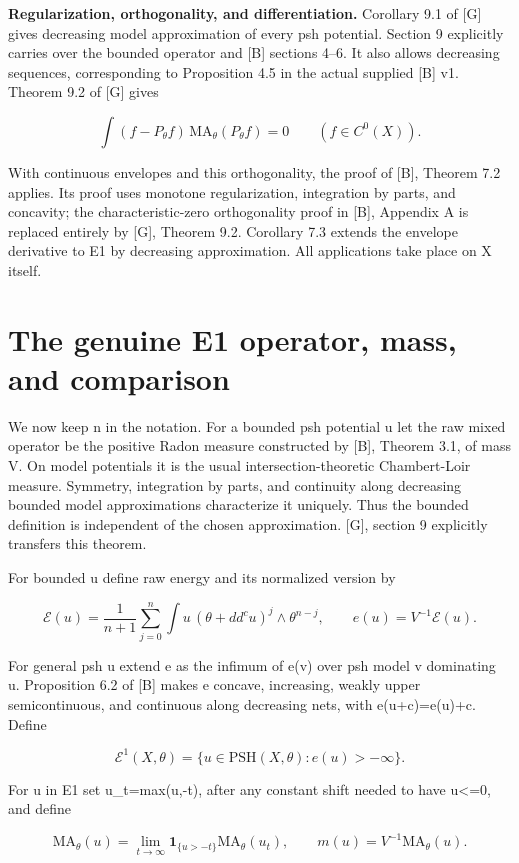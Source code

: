 \documentclass[11pt]{article}
\begin{document}
\textbf{Regularization, orthogonality, and differentiation.} Corollary 9.1 of [G] gives decreasing model approximation of every psh potential. Section 9 explicitly carries over the bounded operator and [B] sections 4--6. It also allows decreasing sequences, corresponding to Proposition 4.5 in the actual supplied [B] v1. Theorem 9.2 of [G] gives

\[
\int (f-P_\theta f)\,\mathrm{MA}_\theta(P_\theta f)=0\qquad(f\in C^0(X)).
\]

With continuous envelopes and this orthogonality, the proof of [B], Theorem 7.2 applies. Its proof uses monotone regularization, integration by parts, and concavity; the characteristic-zero orthogonality proof in [B], Appendix A is replaced entirely by [G], Theorem 9.2. Corollary 7.3 extends the envelope derivative to E1 by decreasing approximation. All applications take place on X itself.

\section{The genuine E1 operator, mass, and comparison}

We now keep n in the notation. For a bounded psh potential u let the raw mixed operator be the positive Radon measure constructed by [B], Theorem 3.1, of mass V. On model potentials it is the usual intersection-theoretic Chambert-Loir measure. Symmetry, integration by parts, and continuity along decreasing bounded model approximations characterize it uniquely. Thus the bounded definition is independent of the chosen approximation. [G], section 9 explicitly transfers this theorem.

For bounded u define raw energy and its normalized version by

\[
\mathcal E(u)=\frac1{n+1}\sum_{j=0}^n
\int u\,(\theta+dd^cu)^j\wedge\theta^{n-j},\qquad
e(u)=V^{-1}\mathcal E(u).
\]

For general psh u extend e as the infimum of e(v) over psh model v dominating u. Proposition 6.2 of [B] makes e concave, increasing, weakly upper semicontinuous, and continuous along decreasing nets, with e(u+c)=e(u)+c. Define

\[
\mathcal E^1(X,\theta)=\{u\in\mathrm{PSH}(X,\theta):e(u)>-\infty\}.
\]

For u in E1 set u\_t=max(u,-t), after any constant shift needed to have u\textless{}=0, and define

\[
\mathrm{MA}_\theta(u)=\lim_{t\to\infty}
\mathbf1_{\{u>-t\}}\mathrm{MA}_\theta(u_t),\qquad
m(u)=V^{-1}\mathrm{MA}_\theta(u).
\]
\end{document}

